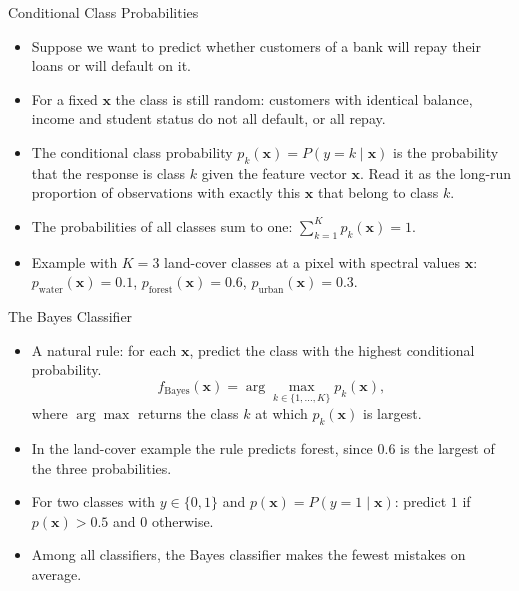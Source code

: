 \begin{frame}{Conditional Class Probabilities}
    \begin{itemize}
        \item Suppose we want to predict whether customers of a bank will repay their loans or will default on it.
        \item For a fixed $\mathbf{x}$ the class is still random: customers with identical balance, income and student status do not all default, or all repay.
        \item The conditional class probability $p_k(\mathbf{x}) = P(y = k \mid \mathbf{x})$ is the probability that the response is class $k$ given the feature vector $\mathbf{x}$. Read it as the long-run proportion of observations with exactly this $\mathbf{x}$ that belong to class $k$.
        \item The probabilities of all classes sum to one: $\sum_{k=1}^{K} p_k(\mathbf{x}) = 1$.
        \item Example with $K = 3$ land-cover classes at a pixel with spectral values $\mathbf{x}$: $p_{\text{water}}(\mathbf{x}) = 0.1$, $p_{\text{forest}}(\mathbf{x}) = 0.6$, $p_{\text{urban}}(\mathbf{x}) = 0.3$.
    \end{itemize}
\end{frame}


\begin{frame}{The Bayes Classifier}
    \begin{itemize}
        \item A natural rule: for each $\mathbf{x}$, predict the class with the highest conditional probability.
        \[
            f_{\text{Bayes}}(\mathbf{x}) = \arg\max_{k \in \{1, \dots, K\}} p_k(\mathbf{x}),
        \]
        where $\arg\max$ returns the class $k$ at which $p_k(\mathbf{x})$ is largest.
        \item In the land-cover example the rule predicts forest, since $0.6$ is the largest of the three probabilities.
        \item For two classes with $y \in \{0, 1\}$ and $p(\mathbf{x}) = P(y = 1 \mid \mathbf{x})$: predict $1$ if $p(\mathbf{x}) > 0.5$ and $0$ otherwise.
        \item Among all classifiers, the Bayes classifier makes the fewest mistakes on average.
    \end{itemize}
\end{frame}


